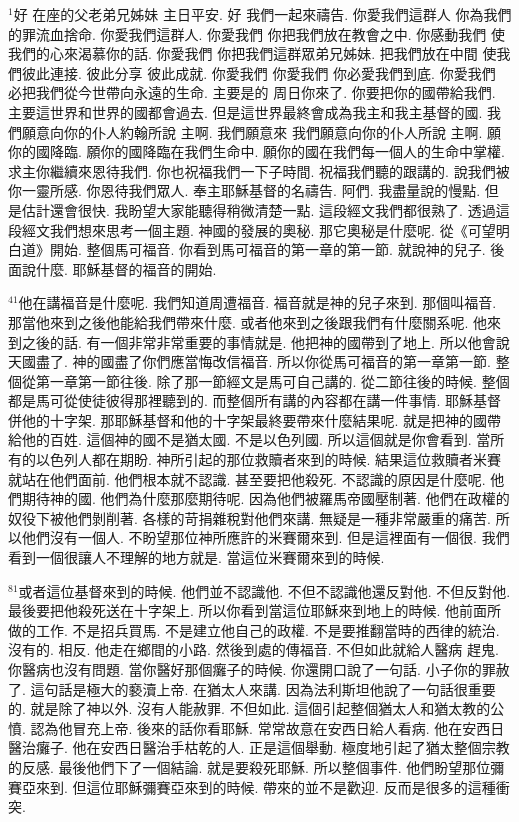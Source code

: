 \documentclass{book}
\begin{document}
$^{1}$好 在座的父老弟兄姊妹 主日平安.
好 我們一起來禱告.
你愛我們這群人 你為我們的罪流血捨命.
你愛我們這群人.
你愛我們 你把我們放在教會之中.
你感動我們 使我們的心來渴慕你的話.
你愛我們 你把我們這群眾弟兄姊妹.
把我們放在中間 使我們彼此連接.
彼此分享 彼此成就.
你愛我們 你愛我們 你必愛我們到底.
你愛我們 必把我們從今世帶向永遠的生命.
主要是的 周日你來了.
你要把你的國帶給我們.
主要這世界和世界的國都會過去.
但是這世界最終會成為我主和我主基督的國.
我們願意向你的仆人約翰所說 主啊.
我們願意來 我們願意向你的仆人所說 主啊.
願你的國降臨.
願你的國降臨在我們生命中.
願你的國在我們每一個人的生命中掌權.
求主你繼續來恩待我們.
你也祝福我們一下子時間.
祝福我們聽的跟講的.
說我們被你一靈所感.
你恩待我們眾人.
奉主耶穌基督的名禱告.
阿們.
我盡量說的慢點.
但是估計還會很快.
我盼望大家能聽得稍微清楚一點.
這段經文我們都很熟了.
透過這段經文我們想來思考一個主題.
神國的發展的奧秘.
那它奧秘是什麼呢.
從《可望明白道》開始.
整個馬可福音.
你看到馬可福音的第一章的第一節.
就說神的兒子.
後面說什麼.
耶穌基督的福音的開始.

$^{41}$他在講福音是什麼呢.
我們知道周遭福音.
福音就是神的兒子來到.
那個叫福音.
那當他來到之後他能給我們帶來什麼.
或者他來到之後跟我們有什麼關系呢.
他來到之後的話.
有一個非常非常重要的事情就是.
他把神的國帶到了地上.
所以他會說天國盡了.
神的國盡了你們應當悔改信福音.
所以你從馬可福音的第一章第一節.
整個從第一章第一節往後.
除了那一節經文是馬可自己講的.
從二節往後的時候.
整個都是馬可從使徒彼得那裡聽到的.
而整個所有講的內容都在講一件事情.
耶穌基督併他的十字架.
那耶穌基督和他的十字架最終要帶來什麼結果呢.
就是把神的國帶給他的百姓.
這個神的國不是猶太國.
不是以色列國.
所以這個就是你會看到.
當所有的以色列人都在期盼.
神所引起的那位救贖者來到的時候.
結果這位救贖者米賽就站在他們面前.
他們根本就不認識.
甚至要把他殺死.
不認識的原因是什麼呢.
他們期待神的國.
他們為什麼那麼期待呢.
因為他們被羅馬帝國壓制著.
他們在政權的奴役下被他們剝削著.
各樣的苛捐雜稅對他們來講.
無疑是一種非常嚴重的痛苦.
所以他們沒有一個人.
不盼望那位神所應許的米賽爾來到.
但是這裡面有一個很.
我們看到一個很讓人不理解的地方就是.
當這位米賽爾來到的時候.

$^{81}$或者這位基督來到的時候.
他們並不認識他.
不但不認識他還反對他.
不但反對他.
最後要把他殺死送在十字架上.
所以你看到當這位耶穌來到地上的時候.
他前面所做的工作.
不是招兵買馬.
不是建立他自己的政權.
不是要推翻當時的西律的統治.
沒有的.
相反.
他走在鄉間的小路.
然後到處的傳福音.
不但如此就給人醫病 趕鬼.
你醫病也沒有問題.
當你醫好那個癱子的時候.
你還開口說了一句話.
小子你的罪赦了.
這句話是極大的褻瀆上帝.
在猶太人來講.
因為法利斯坦他說了一句話很重要的.
就是除了神以外.
沒有人能赦罪.
不但如此.
這個引起整個猶太人和猶太教的公憤.
認為他冒充上帝.
後來的話你看耶穌.
常常故意在安西日給人看病.
他在安西日醫治癱子.
他在安西日醫治手枯乾的人.
正是這個舉動.
極度地引起了猶太整個宗教的反感.
最後他們下了一個結論.
就是要殺死耶穌.
所以整個事件.
他們盼望那位彌賽亞來到.
但這位耶穌彌賽亞來到的時候.
帶來的並不是歡迎.
反而是很多的這種衝突.
\end{document}
